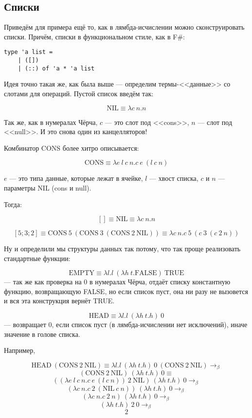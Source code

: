 \documentclass{../../text-style}
\begin{document}
\subsection{Списки}

Приведём для примера ещё то, как в лямбда-исчислении можно сконструировать списки. Причём, списки в функциональном стиле, как в F\#:

\begin{verbatim}
type 'a list =
    | ([])
    | (::) of 'a * 'a list
\end{verbatim}

Идея точно такая же, как была выше --- определим термы-<<данные>> со слотами для операций. Пустой список введём так:

$$\mbox{NIL} \equiv \lambda c\ n.n$$

Так же, как в нумералах Чёрча, $c$ --- это слот под <<cons>>, $n$ --- слот под <<null>>. И это снова один из канцелляторов!

Комбинатор $\mbox{CONS}$ более хитро описывается: 

$$\mbox{CONS} \equiv \lambda e\ l\ c\ n.c\ e\ (l\ c\ n)$$

$e$ --- это типа данные, которые лежат в ячейке, $l$ --- хвост списка, $c$ и $n$ --- параметры NIL (cons и null).

Тогда:

$$[] \equiv \mbox{NIL} \equiv \lambda c\ n.n$$

$$[5; 3; 2] \equiv \mbox{CONS}\ 5\ (\mbox{CONS}\ 3\ (\mbox{CONS}\ 2\ \mbox{NIL})) \equiv \lambda c\ n.c\ 5\ (c\ 3\ (c\ 2\ n))$$

Ну и определили мы структуры данных так потому, что так проще реализовать стандартные функции:

$$\mbox{EMPTY} \equiv \lambda l.l\ (\lambda h\ t.\mbox{FALSE})\ \mbox{TRUE}$$
--- так же как проверка на 0 в нумералах Чёрча, отдаёт списку константную функцию, возвращающую FALSE, но если список пуст, она ни разу не вызовется и вся эта конструкция вернёт TRUE.

$$\mbox{HEAD} \equiv \lambda l.l\ (\lambda h\ t.h)\ 0$$
--- возвращает 0, если список пуст (в лямбда-исчислении нет исключений), иначе значение в голове списка.

Например,

$$\mbox{HEAD}\ (\mbox{CONS}\ 2\ \mbox{NIL}) \equiv \lambda l.l\ (\lambda h\ t.h)\ 0\ (\mbox{CONS}\ 2\ \mbox{NIL}) \rightarrow_\beta$$
$$    (\mbox{CONS}\ 2\ \mbox{NIL})\ (\lambda h\ t.h)\ 0 \equiv$$
$$    ((\lambda e\ l\ c\ n.c\ e\ (l\ c\ n))\ 2\ \mbox{NIL})\ (\lambda h\ t.h)\ 0 \rightarrow_\beta$$
$$    (\lambda c\ n.c\ 2\ (\mbox{NIL}\ c\ n))\ (\lambda h\ t.h)\ 0 \rightarrow_\beta$$
$$    (\lambda c\ n.c\ 2\ n)\ (\lambda h\ t.h)\ 0 \rightarrow_\beta$$
$$    (\lambda h\ t.h)\ 2\ 0 \rightarrow_\beta$$
$$    2$$
\end{document}
